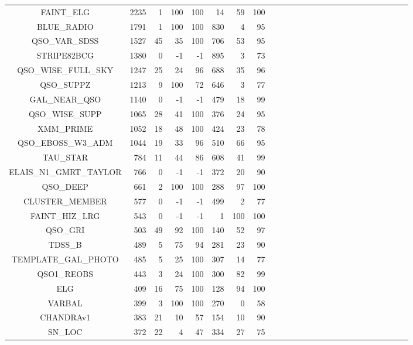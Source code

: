 \documentclass[onecolumn]{aa}
\begin{document}
\begin{center}
\begin{longtable}{c r rrrr rrrr rrrrr rrrrr rrrrr}
FAINT\_ELG               & 2235   & 1    & 100 & 100 & 14     & 59 & 100  \\ 
BLUE\_RADIO              & 1791   & 1    & 100 & 100 & 830    & 4 & 95    \\
QSO\_VAR\_SDSS           & 1527   & 45   & 35  & 100 & 706    & 53 & 95   \\ 
STRIPE82BCG              & 1380   & 0    & -1  & -1  & 895    & 3 & 73    \\
QSO\_WISE\_FULL\_SKY     & 1247   & 25   & 24  & 96  & 688    & 35 & 96   \\ 
QSO\_SUPPZ               & 1213   & 9    & 100 & 72  & 646    & 3 & 77    \\
GAL\_NEAR\_QSO           & 1140   & 0    & -1  & -1  & 479    & 18 & 99   \\
QSO\_WISE\_SUPP          & 1065   & 28   & 41  & 100 & 376    & 24 & 95   \\
XMM\_PRIME               & 1052   & 18   & 48  & 100 & 424    & 23 & 78   \\
QSO\_EBOSS\_W3\_ADM      & 1044   & 19   & 33  & 96  & 510    & 66 & 95   \\
TAU\_STAR                & 784    & 11   & 44  & 86  & 608    & 41 & 99   \\ 
ELAIS\_N1\_GMRT\_TAYLOR  & 766    & 0    & -1  & -1  & 372    & 20 & 90   \\
QSO\_DEEP                & 661    & 2    & 100 & 100 & 288    & 97 & 100  \\
CLUSTER\_MEMBER          & 577    & 0    & -1  & -1  & 499    & 2 & 77    \\
FAINT\_HIZ\_LRG          & 543    & 0    & -1  & -1  & 1      & 100 & 100 \\
QSO\_GRI                 & 503    & 49   & 92  & 100 & 140    & 52 & 97   \\
TDSS\_B                  & 489    & 5    & 75  & 94  & 281    & 23 & 90   \\
TEMPLATE\_GAL\_PHOTO     & 485    & 5    & 25  & 100 & 307    & 14 & 77   \\
QSO1\_REOBS              & 443    & 3    & 24  & 100 & 300    & 82 & 99   \\
ELG                      & 409    & 16   & 75  & 100 & 128    & 94 & 100  \\
VARBAL                   & 399    & 3    & 100 & 100 & 270    & 0 & 58    \\
CHANDRAv1                & 383    & 21   & 10  & 57  & 154    & 10 & 90   \\
SN\_LOC                  & 372    & 22   & 4   & 47  & 334    & 27 & 75   \\

\end{longtable}
\end{center}
\end{document}
